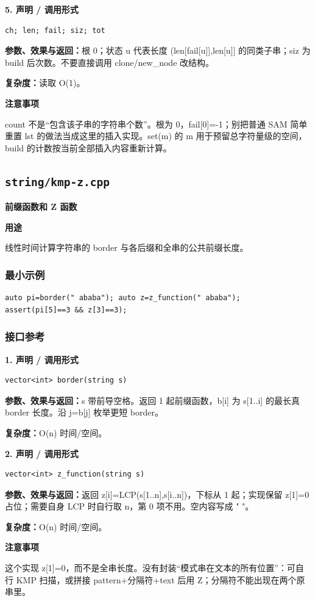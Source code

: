 \documentclass[UTF8,a4paper,10pt]{ctexart}
\newcommand{\TemplUsage}[1]{\textbf{用途}\par #1\par}
\newcommand{\TemplNote}[1]{\textbf{注意事项}\par #1\par}
\begin{document}
\noindent\begin{minipage}{\textwidth}
\textbf{5. 声明 / 调用形式}
\begin{lstlisting}
ch; len; fail; siz; tot
\end{lstlisting}
\textbf{参数、效果与返回：}根 0；状态 u 代表长度 (len[fail[u]],len[u]] 的同类子串；siz 为 build 后次数。不要直接调用 clone/new\_node 改结构。

\textbf{复杂度：}读取 O(1)。

\TemplNote{count 不是“包含该子串的字符串个数”。根为 0，fail[0]=-1；别把普通 SAM 简单重置 lst 的做法当成这里的插入实现。set(m) 的 m 用于预留总字符量级的空间，build 的计数按当前全部插入内容重新计算。}
\end{minipage}\par\vspace{0.4em}
\clearpage
\subsection{\texttt{string/kmp-z.cpp}}
\textbf{前缀函数和 Z 函数}\par
\TemplUsage{线性时间计算字符串的 border 与各后缀和全串的公共前缀长度。}
\subsubsection*{最小示例}
\begin{lstlisting}
auto pi=border(" ababa"); auto z=z_function(" ababa");
assert(pi[5]==3 && z[3]==3);
\end{lstlisting}
\subsubsection*{接口参考}
\noindent\begin{minipage}{\textwidth}
\textbf{1. 声明 / 调用形式}
\begin{lstlisting}
vector<int> border(string s)
\end{lstlisting}
\textbf{参数、效果与返回：}s 带前导空格。返回 1 起前缀函数，b[i] 为 s[1..i] 的最长真 border 长度。沿 j=b[j] 枚举更短 border。

\textbf{复杂度：}O(n) 时间/空间。

\end{minipage}\par\vspace{0.4em}
\noindent\begin{minipage}{\textwidth}
\textbf{2. 声明 / 调用形式}
\begin{lstlisting}
vector<int> z_function(string s)
\end{lstlisting}
\textbf{参数、效果与返回：}返回 z[i]=LCP(s[1..n],s[i..n])，下标从 1 起；实现保留 z[1]=0 占位；需要自身 LCP 时自行取 n，第 0 项不用。空内容写成 " "。

\textbf{复杂度：}O(n) 时间/空间。

\TemplNote{这个实现 z[1]=0，而不是全串长度。没有封装“模式串在文本的所有位置”：可自行 KMP 扫描，或拼接 pattern+分隔符+text 后用 Z；分隔符不能出现在两个原串里。}
\end{minipage}\par\vspace{0.4em}
\clearpage
\end{document}
